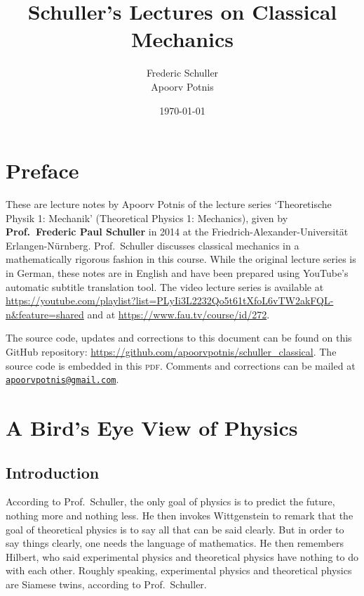 \documentclass[a4 paper, 12pt]{book}
\title{Schuller's Lectures on Classical Mechanics}
\author{Frederic Schuller\\Apoorv Potnis}
\date{\today}
\theoremstyle{definition}
\begin{document}
    \hypertarget{TitlePage}{}
    \maketitle

    \chapter*{Preface}
    \hypertarget{Preface}{}
    These are lecture notes by Apoorv Potnis of the lecture series `Theoretische Physik 1: Mechanik' (Theoretical Physics 1: Mechanics), given by \textbf{Prof.\ Frederic Paul Schuller} in 2014 at the Friedrich-Alexander-Universität Erlangen-Nürnberg. Prof.\ Schuller discusses classical mechanics in a mathematically rigorous fashion in this course. While the original lecture series is in German, these notes are in English and have been prepared using YouTube's automatic subtitle translation tool. The video lecture series is available at \url{https://youtube.com/playlist?list=PLyIi3L2232Qo5t61tXfoL6vTW2akFQL-n&feature=shared} and at \url{https://www.fau.tv/course/id/272}.

    The source code, updates and corrections to this document can be found on this GitHub repository: \url{https://github.com/apoorvpotnis/schuller_classical}. The source code is embedded in this \textsc{pdf}. Comments and corrections can be mailed at \href{mailto:apoorvpotnis@gmail.com}{\texttt{apoorvpotnis@gmail.com}}.
    \clearpage

    \hypertarget{Contents}{}
    \tableofcontents

    \chapter{A Bird's Eye View of Physics}

    \section{Introduction}

    According to Prof.\ Schuller, the only goal of physics is to predict the future, nothing more and nothing less. He then invokes Wittgenstein to remark that the goal of theoretical physics is to say all that can be said clearly. But in order to say things clearly, one needs the language of mathematics. He then remembers Hilbert, who said experimental physics and theoretical physics have nothing to do with each other. Roughly speaking, experimental physics and theoretical physics are Siamese twins, according to Prof.\ Schuller.
\end{document}
